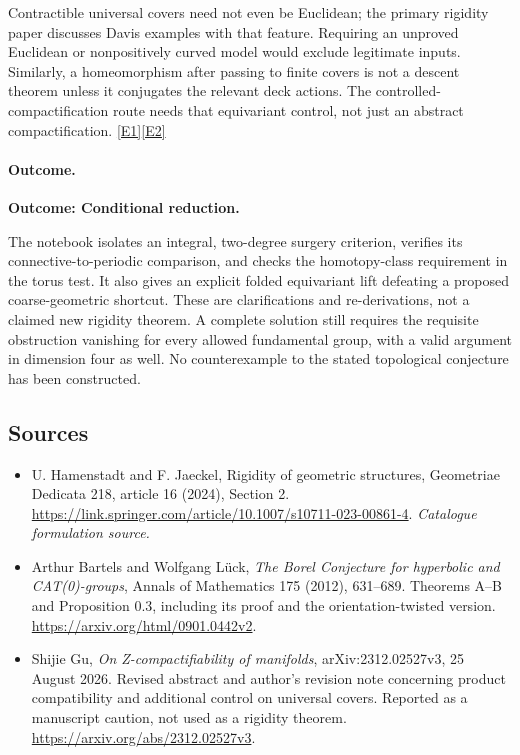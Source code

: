 \documentclass[11pt,a4paper]{article}
\newcommand{\eref}[2]{\hyperlink{extra:#1:#2}{[E#2]}}
\numberwithin{equation}{section}
\begin{document}
Contractible universal covers need not even be Euclidean; the primary
rigidity paper discusses Davis examples with that feature. Requiring an
unproved Euclidean or nonpositively curved model would exclude legitimate
inputs. Similarly, a homeomorphism after passing to finite covers is not
a descent theorem unless it conjugates the relevant deck actions.
The controlled-compactification route needs that equivariant control,
not just an abstract compactification. \eref{115}{1}\eref{115}{2}

\paragraph{Outcome.}
\textbf{Outcome: Conditional reduction.}

The notebook isolates an integral, two-degree surgery criterion, verifies
its connective-to-periodic comparison, and checks the homotopy-class
requirement in the torus test. It also gives an explicit folded equivariant
lift defeating a proposed coarse-geometric shortcut. These are
clarifications and re-derivations, not a claimed new rigidity theorem.
A complete solution still requires the requisite obstruction vanishing
for every allowed fundamental group, with a valid argument in dimension
four as well. No counterexample to the stated topological conjecture has
been constructed.

\subsection{Sources}
\begin{itemize}\raggedright
\item[\textnormal{[S1]}]\hypertarget{source:115:1}{} U. Hamenstadt and F. Jaeckel, Rigidity of geometric structures, Geometriae Dedicata 218, article 16 (2024), Section 2.
\url{https://link.springer.com/article/10.1007/s10711-023-00861-4}.
{\small\textit{Catalogue formulation source.}}
\item[\textnormal{[E1]}]\hypertarget{extra:115:1}{} Arthur Bartels and Wolfgang L\"uck,
\emph{The Borel Conjecture for hyperbolic and CAT(0)-groups},
Annals of Mathematics 175 (2012), 631--689. Theorems A--B and
Proposition 0.3, including its proof and the orientation-twisted version.
\url{https://arxiv.org/html/0901.0442v2}.
\item[\textnormal{[E2]}]\hypertarget{extra:115:2}{} Shijie Gu,
\emph{On Z-compactifiability of manifolds}, arXiv:2312.02527v3,
25 August 2026. Revised abstract and author's revision note concerning
product compatibility and additional control on universal covers.
Reported as a manuscript caution, not used as a rigidity theorem.
\url{https://arxiv.org/abs/2312.02527v3}.
\end{itemize}
\end{document}
